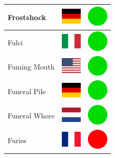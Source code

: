 \documentclass[12pt, a4paper, twoside]{report}
\begin{document}
\begin{center}
\begin{longtable}{|p{5cm}|p{2cm}|p{2cm}|}
 Frostshock                                                 & \includegraphics[width=1cm]{../img/flags/de} &   \includegraphics[width=1cm]{../likes/y} \\ \hline
 Fulci                                                      & \includegraphics[width=1cm]{../img/flags/it} &   \includegraphics[width=1cm]{../likes/y} \\ \hline
 Fuming Mouth                                               & \includegraphics[width=1cm]{../img/flags/us} &   \includegraphics[width=1cm]{../likes/y} \\ \hline
 Funeral Pile                                               & \includegraphics[width=1cm]{../img/flags/de} &   \includegraphics[width=1cm]{../likes/y} \\ \hline
 Funeral Whore                                              & \includegraphics[width=1cm]{../img/flags/nl} &   \includegraphics[width=1cm]{../likes/y} \\ \hline
 Furies                                                     & \includegraphics[width=1cm]{../img/flags/fr} &   \includegraphics[width=1cm]{../likes/n} \\ \hline

\end{longtable}
\end{center}
\end{document}
